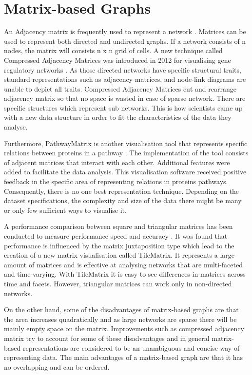 \documentclass{l4proj}
\begin{document}
\section{Matrix-based Graphs}

An Adjacency matrix is frequently used to represent a network \cite{longabaugh2012combing}. Matrices can be used to represent both directed and undirected graphs. If a network consists of n nodes, the matrix will consists n x n grid of cells. A new technique called Compressed Adjacency Matrices was introduced in 2012 for visualising gene regulatory networks \cite{dinkla2012compressed}. As those directed networks have specific structural traits, standard representations such as adjacency matrices, and node-link diagrams are unable to depict all traits. Compressed Adjacency Matrices cut and rearrange adjacency matrix so that no space is wasted in case of sparse network. There are specific structures which represent sub networks. This is how scientists came up with a new data structure in order to fit the characteristics of the data they analyse.

Furthermore, PathwayMatrix is another visualisation tool that represents specific relations between proteins in a pathway \cite{dang2015pathwaymatrix}. The implementation of the tool consists of adjacent matrices that interact with each other. Additional features were added to facilitate the data analysis. This visualisation software received positive feedback in the specific area of representing relations in proteins pathways. Consequently, there is no one best representation technique. Depending on the dataset specifications, the complexity and size of the data there might be many or only few sufficient ways to visualise it.       

A performance comparison between square and triangular matrices has been conducted to measure performance speed and accuracy \cite{liu2015effects}. It was found that performance is influenced by the matrix juxtaposition type which lead to the creation of a new matrix visualisation called TileMatrix. It represents a large amount of matrices and is effective at analysing networks that are multi-faceted and time-varying. With TileMatrix it is easy to see differences in matrices across time and facets. However, triangular matrices can work only in non-directed networks. 

On the other hand, some of the disadvantages of matrix-based graphs are that the area increases quadratically and as large networks are sparse there will be mainly empty space on the matrix. Improvements such as compressed adjacency matrix try to account for some of these disadvantages and in general matrix-based representations are considered to be an unambiguous and concise way of representing data. The main advantages of a matrix-based graph are that it has no overlapping and can be ordered.
\end{document}
